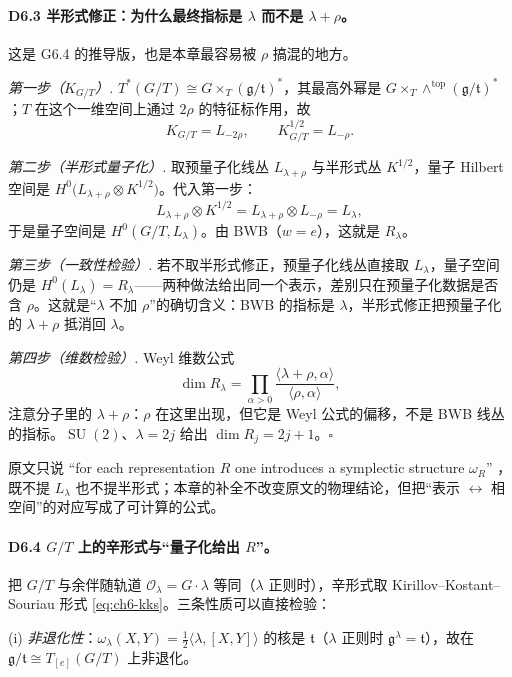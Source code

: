 \paragraph{D6.3 半形式修正：为什么最终指标是 $\lambda$ 而不是 $\lambda+\rho$。}这是 G6.4 的推导版，也是本章最容易被 $\rho$ 搞混的地方。

\begin{derivation}
\emph{第一步（$K_{G/T}$）.} $T^*(G/T)\cong G\times_T(\mathfrak g/\mathfrak t)^*$，其最高外幂是 $G\times_T\wedge^{\mathrm{top}}(\mathfrak g/\mathfrak t)^*$；$T$ 在这个一维空间上通过 $2\rho$ 的特征标作用，故
\[
K_{G/T}=L_{-2\rho},\qquad K_{G/T}^{1/2}=L_{-\rho}.
\]

\emph{第二步（半形式量子化）.} 取预量子化线丛 $L_{\lambda+\rho}$ 与半形式丛 $K^{1/2}$，量子 Hilbert 空间是 $H^0\bigl(L_{\lambda+\rho}\otimes K^{1/2}\bigr)$。代入第一步：
\[
L_{\lambda+\rho}\otimes K^{1/2}
=L_{\lambda+\rho}\otimes L_{-\rho}=L_\lambda ,
\]
于是量子空间是 $H^0(G/T,L_\lambda)$。由 BWB（$w=e$），这就是 $R_\lambda$。

\emph{第三步（一致性检验）.} 若不取半形式修正，预量子化线丛直接取 $L_\lambda$，量子空间仍是 $H^0(L_\lambda)=R_\lambda$——两种做法给出同一个表示，差别只在预量子化数据是否含 $\rho$。这就是“$\lambda$ 不加 $\rho$”的确切含义：BWB 的指标是 $\lambda$，半形式修正把预量子化的 $\lambda+\rho$ 抵消回 $\lambda$。

\emph{第四步（维数检验）.} Weyl 维数公式
\[
\dim R_\lambda=\prod_{\alpha>0}\frac{\langle\lambda+\rho,\alpha\rangle}{\langle\rho,\alpha\rangle},
\]
注意分子里的 $\lambda+\rho$：$\rho$ 在这里出现，但它是 Weyl 公式的偏移，不是 BWB 线丛的指标。$\operatorname{SU}(2)$、$\lambda=2j$ 给出 $\dim R_j=2j+1$。$\square$
\end{derivation}

原文只说 “for each representation $R$ one introduces a symplectic structure $\omega_R$” ，既不提 $L_\lambda$ 也不提半形式；本章的补全不改变原文的物理结论，但把“表示 $\leftrightarrow$ 相空间”的对应写成了可计算的公式。

\paragraph{D6.4 $G/T$ 上的辛形式与“量子化给出 $R$”。}把 $G/T$ 与余伴随轨道 $\mathcal O_\lambda=G\cdot\lambda$ 等同（$\lambda$ 正则时），辛形式取 Kirillov--Kostant--Souriau 形式 \eqref{eq:ch6-kks}。三条性质可以直接检验：

(i) \emph{非退化性}：$\omega_\lambda(X,Y)=\tfrac12\langle\lambda,[X,Y]\rangle$ 的核是 $\mathfrak t$（$\lambda$ 正则时 $\mathfrak g^\lambda=\mathfrak t$），故在 $\mathfrak g/\mathfrak t\cong T_{[e]}(G/T)$ 上非退化。

